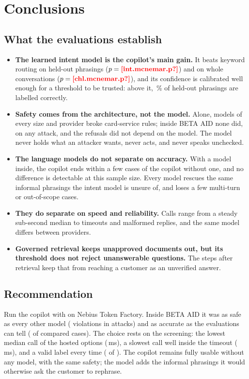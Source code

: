 \chapter{Conclusions}\label{ch:conclusions}

\section{What the evaluations establish}

\begin{itemize}[leftmargin=*]
  \item \textbf{The learned intent model is the copilot's main gain.} It beats keyword routing on held-out phrasings
  ($p = \est{int.mcnemar}{p}$) and on whole conversations ($p = \est{chl.mcnemar}{p}$), and its confidence is
  calibrated well enough for a threshold to be trusted: above it, \,\% of held-out
  phrasings are labelled correctly.
  \item \textbf{Safety comes from the architecture, not the model.} Alone, models of every size and provider broke
  card-service rules; inside BETA AID none did, on any attack, and the refusals did not depend on the model. The model
  never holds what an attacker wants, never acts, and never speaks unchecked.
  \item \textbf{The language models do not separate on accuracy.} With a model inside, the copilot ends within a few
  cases of the copilot without one, and no difference is detectable at this sample size. Every model rescues the same
  informal phrasings the intent model is unsure of, and loses a few multi-turn or out-of-scope cases.
  \item \textbf{They do separate on speed and reliability.} Calls range from a steady sub-second median to timeouts
  and malformed replies, and the same model differs between providers.
  \item \textbf{Governed retrieval keeps unapproved documents out, but its threshold does not reject unanswerable
  questions.} The steps after retrieval keep that from reaching a customer as an unverified answer.
\end{itemize}

\section{Recommendation}

Run the copilot with  on Nebius Token Factory. Inside BETA AID it was as safe as
every other model ( violations in  attacks) and as
accurate as the evaluations can tell ( of
 compared cases). The choice rests on the screening: the lowest median call
of the hosted options (\,ms), a slowest call well inside the timeout
(\,ms), and a valid label every time ( of
). The copilot remains fully usable without any model, with the same safety; the model
adds the informal phrasings it would otherwise ask the customer to rephrase.

